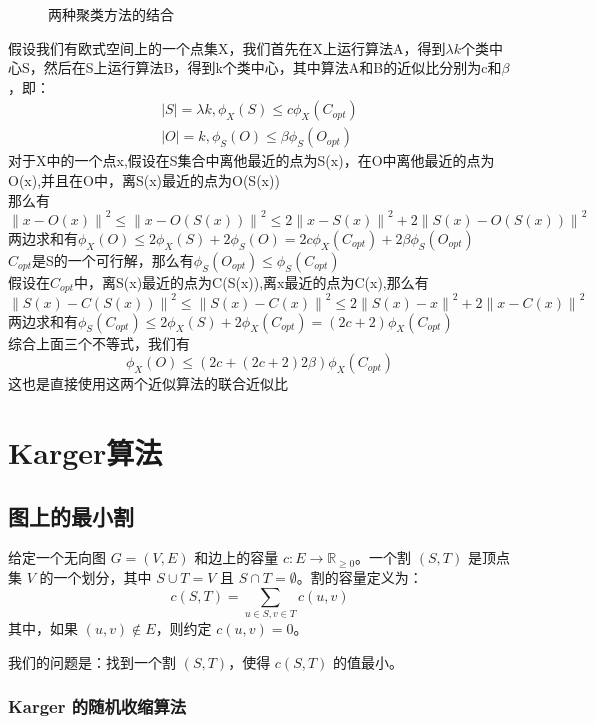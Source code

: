 \documentclass[lang=cn,newtx,10pt,scheme=chinese,chinesefont=nofont,citestyle=gb7714-2015, bibstyle=gb7714-2015]{elegantbook}
\begin{document}
\begin{refsection}
\begin{figure}[htbp]
\begin{tikzpicture}[node distance=2cm, auto]
\end{tikzpicture}
\caption{两种聚类方法的结合}
\end{figure}
假设我们有欧式空间上的一个点集X，我们首先在X上运行算法A，得到$\lambda k$个类中心S，然后在S上运行算法B，得到k个类中心，其中算法A和B的近似比分别为c和$\beta$，即：
\begin{align*}
    |{S}|=\lambda k, \phi_X(S)\leq c \phi_X(C_{opt})\\
    |O|=k, \phi_S(O)\leq \beta\phi_S(O_{opt})
\end{align*}
对于X中的一个点x,假设在S集合中离他最近的点为S(x)，在O中离他最近的点为O(x),并且在O中，离S(x)最近的点为O(S(x))\\
那么有
\[
\left\lVert x-O(x)\right\rVert^2 \leq \left\lVert x-O(S(x))\right\rVert^2 \leq 2\left\lVert x-S(x)\right\rVert^2 + 2\left\lVert S(x)-O(S(x))\right\rVert^2
\]
两边求和有$\phi_X(O) \leq 2\phi_X(S) + 2 \phi_S(O) = 2c\phi_X(C_{opt})+2\beta\phi_S(O_{opt})$\\
$C_{opt}$是S的一个可行解，那么有$\phi_S(O_{opt})\leq\phi_S(C_{opt})$\\
假设在$C_{opt}$中，离S(x)最近的点为C(S(x)),离x最近的点为C(x),那么有
\[
\left\lVert S(x)-C(S(x))\right\rVert^2 \leq \left\lVert S(x)-C(x)\right\rVert^2 \leq 2\left\lVert S(x)-x\right\rVert^2 + 2\left\lVert x-C(x)\right\rVert^2
\]
两边求和有$\phi_S(C_{opt}) \leq 2\phi_X(S) + 2 \phi_X(C_{opt}) = (2c+2)\phi_X(C_{opt})$\\
综合上面三个不等式，我们有
\[
\phi_X(O) \leq (2c+(2c+2)2\beta)\phi_X(C_{opt})
\]
这也是直接使用这两个近似算法的联合近似比

\section{Karger算法}
\subsection{图上的最小割}

给定一个无向图 \( G = (V, E) \) 和边上的容量 \( c: E \to \mathbb{R}_{\geq 0} \)。一个割 \( (S, T) \) 是顶点集 \( V \) 的一个划分，其中 \( S \cup T = V \) 且 \( S \cap T = \emptyset \)。割的容量定义为：
\[
c(S, T) = \sum_{u \in S, v \in T} c(u, v)
\]
其中，如果 \( (u, v) \notin E \)，则约定 \( c(u, v) = 0 \)。

我们的问题是：找到一个割 \( (S, T) \)，使得 \( c(S, T) \) 的值最小。

\subsubsection{Karger 的随机收缩算法}


\end{refsection}
\end{document}

